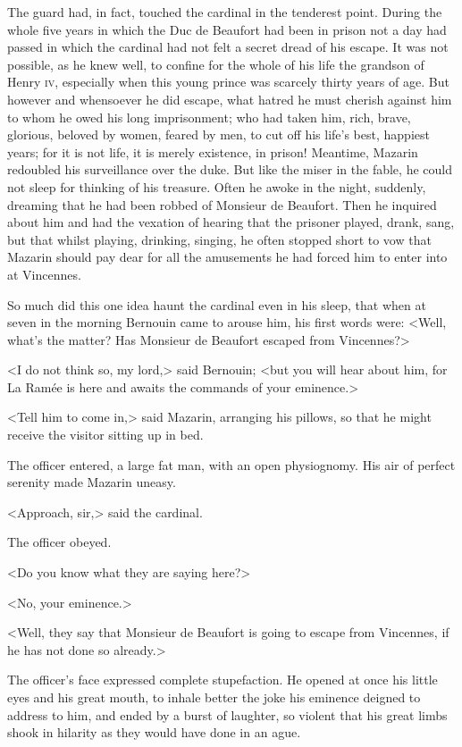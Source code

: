 The guard had, in fact, touched the cardinal in the tenderest point. During the whole five years in which the Duc de Beaufort had been in prison not a day had passed in which the cardinal had not felt a secret dread of his escape. It was not possible, as he knew well, to confine for the whole of his life the grandson of Henry \textsc{iv}, especially when this young prince was scarcely thirty years of age. But however and whensoever he did escape, what hatred he must cherish against him to whom he owed his long imprisonment; who had taken him, rich, brave, glorious, beloved by women, feared by men, to cut off his life's best, happiest years; for it is not life, it is merely existence, in prison! Meantime, Mazarin redoubled his surveillance over the duke. But like the miser in the fable, he could not sleep for thinking of his treasure. Often he awoke in the night, suddenly, dreaming that he had been robbed of Monsieur de Beaufort. Then he inquired about him and had the vexation of hearing that the prisoner played, drank, sang, but that whilst playing, drinking, singing, he often stopped short to vow that Mazarin should pay dear for all the amusements he had forced him to enter into at Vincennes.

So much did this one idea haunt the cardinal even in his sleep, that when at seven in the morning Bernouin came to arouse him, his first words were: <Well, what's the matter? Has Monsieur de Beaufort escaped from Vincennes?>

<I do not think so, my lord,> said Bernouin; <but you will hear about him, for La Ramée is here and awaits the commands of your eminence.>

<Tell him to come in,> said Mazarin, arranging his pillows, so that he might receive the visitor sitting up in bed.

The officer entered, a large fat man, with an open physiognomy. His air of perfect serenity made Mazarin uneasy.

<Approach, sir,> said the cardinal.

The officer obeyed.

<Do you know what they are saying here?>

<No, your eminence.>

<Well, they say that Monsieur de Beaufort is going to escape from Vincennes, if he has not done so already.>

The officer's face expressed complete stupefaction. He opened at once his little eyes and his great mouth, to inhale better the joke his eminence deigned to address to him, and ended by a burst of laughter, so violent that his great limbs shook in hilarity as they would have done in an ague.

